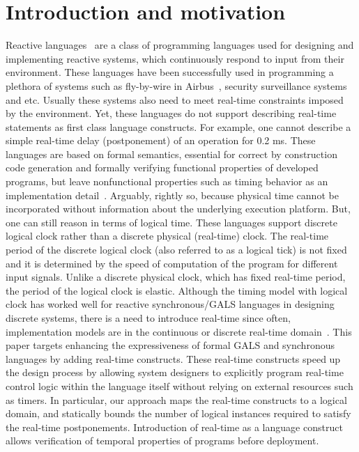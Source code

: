 \section{Introduction and motivation}
\label{sec:intr-motiv}

Reactive languages~\cite{gber931,amal10} are a class of programming
languages used for designing and implementing reactive systems, which
continuously respond to input from their environment. These languages
have been successfully used in programming a plethora of systems such as
fly-by-wire in Airbus~\cite{eairbus}, security surveillance
systems~\cite{amal121} and etc. Usually these systems also need to meet
real-time constraints imposed by the environment. Yet, these languages
do not support describing real-time statements as first class language
constructs.  For example, one cannot describe a simple real-time delay
(postponement) of an operation for 0.2 ms. These languages are based on
formal semantics, essential for correct by construction code generation
and formally verifying functional properties of developed programs, but
leave nonfunctional properties such as timing behavior as an
implementation detail~\cite{boldt07}. Arguably, rightly so, because
physical time cannot be incorporated without information about the
underlying execution platform.  But, one can still reason in terms of
logical time. These languages support discrete logical clock rather than
a discrete physical (real-time) clock. The real-time period of the
discrete logical clock (also referred to as a logical tick) is not fixed
and it is determined by the speed of computation of the program for
different input signals. Unlike a discrete physical clock, which has
fixed real-time period, the period of the logical clock is elastic.
Although the timing model with logical clock has worked well for
reactive synchronous/GALS languages in designing discrete systems, there
is a need to introduce real-time since often, implementation models are
in the continuous or discrete real-time
domain~\cite{DBLP:journals/pieee/SifakisTY03}. This paper targets
enhancing the expressiveness of formal GALS and synchronous languages by
adding real-time constructs. These real-time constructs speed up the
design process by allowing system designers to explicitly program
real-time control logic within the language itself without relying on
external resources such as timers. In particular, our approach maps the
real-time constructs to a logical domain, and statically bounds the
number of logical instances required to satisfy the real-time
postponements. Introduction of real-time as a language construct allows
verification of temporal properties of programs before deployment.

